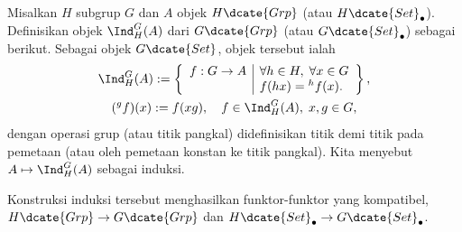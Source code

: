 \begin{definisi}
	Misalkan $H$ subgrup $G$ dan $A$ objek $H\dcate{Grp}$ (atau
	$H\dcate{Set}_\bullet$). Definisikan objek $\Ind^G_H(A)$ dari
	$G\dcate{Grp}$ (atau $G\dcate{Set}_\bullet$) sebagai berikut. Sebagai
	objek $G\dcate{Set}$, objek tersebut ialah
	\begin{gather*}
		\Ind^G_H(A) := \left\{\begin{array}{r|l}
			f: G \to A & \forall h \in H, \; \forall x \in G \\
			& f(hx) = {}^h f(x).
		\end{array}\right\}, \\
		({}^g f)(x) := f(xg), \quad f \in \Ind^G_H(A), \; x, g \in G,
	\end{gather*}
	dengan operasi grup (atau titik pangkal) didefinisikan titik demi titik pada
	pemetaan (atau oleh pemetaan konstan ke titik pangkal). Kita menyebut
	$A\mapsto\Ind^G_H(A)$ sebagai induksi.
\end{definisi}

Konstruksi induksi tersebut menghasilkan funktor-funktor yang kompatibel,
$H\dcate{Grp}\to G\dcate{Grp}$ dan
$H\dcate{Set}_\bullet\to G\dcate{Set}_\bullet$.


